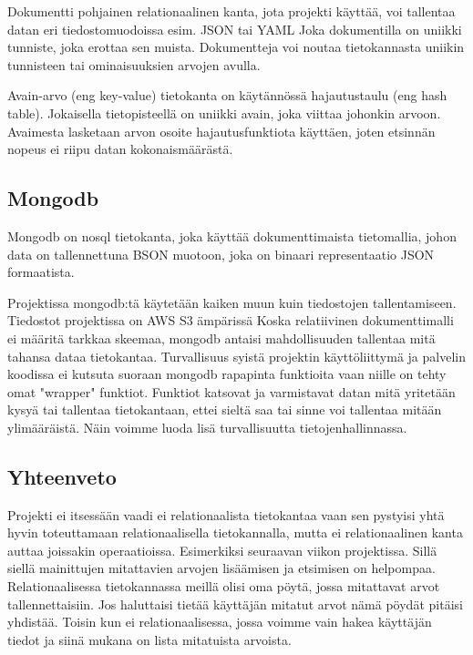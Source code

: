 Dokumentti pohjainen relationaalinen kanta, jota projekti käyttää, voi tallentaa datan eri tiedostomuodoissa esim. JSON tai YAML
Joka dokumentilla on uniikki tunniste, joka erottaa sen muista. 
Dokumentteja voi noutaa tietokannasta uniikin tunnisteen tai ominaisuuksien arvojen avulla.
\medskip

Avain-arvo (eng key-value) tietokanta on käytännössä hajautustaulu (eng hash table).
Jokaisella tietopisteellä on uniikki avain, joka viittaa johonkin arvoon. 
Avaimesta lasketaan arvon osoite hajautusfunktiota käyttäen, joten etsinnän nopeus ei riipu datan kokonaismäärästä.
\medskip




\subsection*{Mongodb}

Mongodb on nosql tietokanta, joka käyttää dokumenttimaista tietomallia, johon data on tallennettuna BSON muotoon, joka on binaari representaatio JSON formaatista.
\medskip

Projektissa mongodb:tä käytetään kaiken muun kuin tiedostojen tallentamiseen. Tiedostot projektissa on AWS S3 ämpärissä
Koska relatiivinen dokumenttimalli ei määritä tarkkaa skeemaa, mongodb antaisi mahdollisuuden tallentaa mitä tahansa dataa tietokantaa.
Turvallisuus syistä projektin käyttöliittymä ja palvelin koodissa ei kutsuta suoraan mongodb rapapinta funktioita vaan niille on tehty omat "wrapper"{} funktiot.
Funktiot katsovat ja varmistavat datan mitä yritetään kysyä tai tallentaa tietokantaan, ettei sieltä saa tai sinne voi tallentaa mitään ylimääräistä.
Näin voimme luoda lisä turvallisuutta tietojenhallinnassa.
\medskip



\subsection*{Yhteenveto}


Projekti ei itsessään vaadi ei relationaalista tietokantaa vaan sen pystyisi yhtä hyvin toteuttamaan relationaalisella tietokannalla, 
mutta ei relationaalinen kanta auttaa joissakin operaatioissa.
Esimerkiksi seuraavan viikon projektissa. Sillä siellä mainittujen mitattavien arvojen lisäämisen ja etsimisen on helpompaa.
Relationaalisessa tietokannassa meillä olisi oma pöytä, jossa mitattavat arvot tallennettaisiin.
Jos haluttaisi tietää käyttäjän mitatut arvot nämä pöydät pitäisi yhdistää.
Toisin kun ei relationaalisessa, jossa voimme vain hakea käyttäjän tiedot ja siinä mukana on lista mitatuista arvoista.



